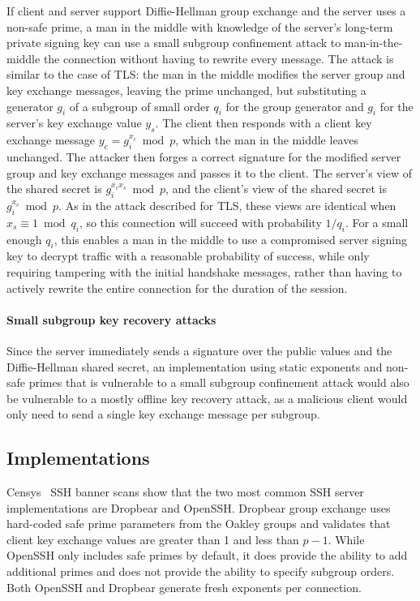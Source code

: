 If client and server support Diffie-Hellman group exchange and the server uses
a non-safe prime, a man in the middle with knowledge of the server's long-term
private signing key can use a small subgroup confinement attack to
man-in-the-middle the connection without having to rewrite every message.  The
attack is similar to the case of TLS: the man in the middle modifies the server
group and key exchange messages, leaving the prime unchanged, but substituting
a generator $g_i$ of a subgroup of small order $q_i$ for the group generator
and $g_i$ for the server's key exchange value $y_s$.  The client then responds
with a client key exchange message $y_c = g_i^{x_c} \bmod p$, which the man in
the middle leaves unchanged.  The attacker then forges a correct signature for
the modified server group and key exchange messages and passes it to the
client.  The server's view of the shared secret is $g_i^{x_c x_s} \bmod p$, and
the client's view of the shared secret is $g_i^{x_c} \bmod p$.  As in the
attack described for TLS, these views are identical when $x_s \equiv 1 \bmod
q_i$, so this connection will succeed with probability $1/q_i$.  For a small
enough $q_i$, this enables a man in the middle to use a compromised server
signing key to decrypt traffic with a reasonable probability of success, while
only requiring tampering with the initial handshake messages, rather than
having to actively rewrite the entire connection for the duration of the
session.

\paragraph{Small subgroup key recovery attacks}
Since the server immediately sends a signature over the public values and the
Diffie-Hellman shared secret, an implementation using static exponents and non-safe primes that is
vulnerable to a small subgroup confinement attack would also be vulnerable to a
mostly offline key recovery attack, as a malicious client would only need to
send a single key exchange message per subgroup.


\SSHHostValidationTable

\ECMDistributionTable

\subsection{Implementations}

Censys~\cite{censys} SSH banner scans show that the two most common SSH server implementations
are Dropbear and OpenSSH. Dropbear group exchange uses hard-coded safe prime parameters from the Oakley groups and validates that client key exchange values are greater than 1 and less than $p - 1$. While OpenSSH
only includes safe primes by default, it does provide the ability to add additional primes and
does not provide the ability to specify subgroup orders. Both OpenSSH and Dropbear generate fresh
exponents per connection.

